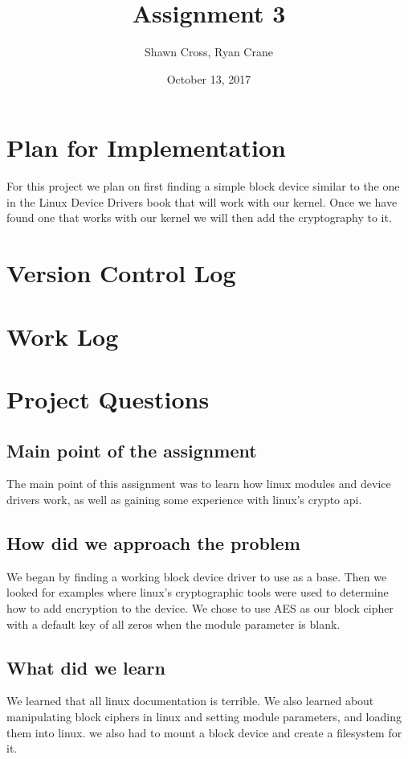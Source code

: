 \documentclass[letterpaper,10pt,titlepage]{article}
\begin{document}
\title{Assignment 3}
\date{October 13, 2017}
\author{Shawn Cross, Ryan Crane}
\maketitle

\section{Plan for Implementation}

For this project we plan on first finding a simple block device similar to the 
one in the Linux Device Drivers book that will work with our kernel. Once we 
have found one that works with our kernel we will then add the cryptography to 
it. 

\section{Version Control Log}

\section{Work Log}

\section{Project Questions}

\subsection{Main point of the assignment}
The main point of this assignment was to learn how linux modules and device drivers work, 
as well as gaining some experience with linux's crypto api. 
\subsection{How did we approach the problem}
We began by finding a working block device driver to use as a base. Then we looked for examples 
where linux's cryptographic tools were used to determine how to add encryption to the device. We chose
 to use AES as our block cipher with a default key of all zeros when the module parameter is blank.

\subsection{What did we learn}
We learned that all linux documentation is terrible. We also learned about manipulating 
block ciphers in linux and setting module parameters, and loading them into linux. we also had
to mount a block device and create a filesystem for it.
\end{document}
